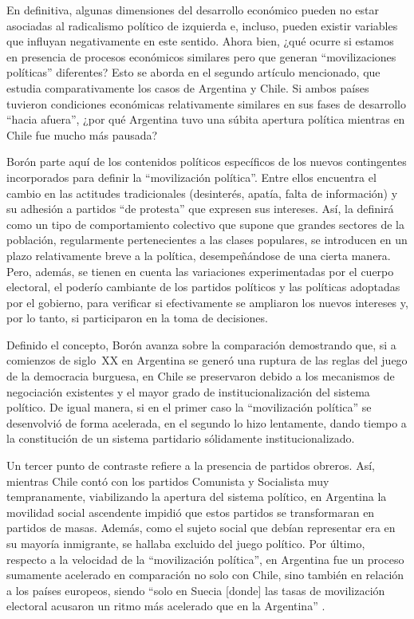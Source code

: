 {En definitiva, algunas dimensiones del desarrollo económico pueden no estar asociadas al radicalismo político de izquierda e, incluso, pueden existir variables que influyan negativamente en este sentido. Ahora bien, ¿qué ocurre si estamos en presencia de procesos económicos similares pero que generan \enquote{movilizaciones políticas} diferentes? Esto se aborda en el segundo artículo mencionado, que estudia comparativamente los casos de Argentina y Chile. Si ambos países tuvieron condiciones económicas relativamente similares en sus fases de desarrollo \enquote{hacia afuera}, ¿por qué Argentina tuvo una súbita apertura política mientras en Chile fue mucho más pausada?

Borón parte aquí de los contenidos políticos específicos de los nuevos contingentes incorporados para definir la \enquote{movilización política}. Entre ellos encuentra el cambio en las actitudes tradicionales (desinterés, apatía, falta de información) y su adhesión a partidos \enquote{de protesta} que expresen sus intereses. Así, la definirá como un tipo de comportamiento colectivo que supone que grandes sectores de la población, regularmente pertenecientes a las clases populares, se introducen en un plazo relativamente breve a la política, desempeñándose de una cierta manera. Pero, además, se tienen en cuenta las variaciones experimentadas por el cuerpo electoral, el poderío cambiante de los partidos políticos y las políticas adoptadas por el gobierno, para verificar si efectivamente se ampliaron los nuevos intereses y, por lo tanto, si participaron en la toma de decisiones.

Definido el concepto, Borón avanza sobre la comparación demostrando que, si a comienzos de siglo~XX en Argentina se generó una ruptura de las reglas del juego de la democracia burguesa, en Chile se preservaron debido a los mecanismos de negociación existentes y el mayor grado de institucionalización del sistema político. De igual manera, si en el primer caso la \enquote{movilización política} se desenvolvió de forma acelerada, en el segundo lo hizo lentamente, dando tiempo a la constitución de un sistema partidario sólidamente institucionalizado.

Un tercer punto de contraste refiere a la presencia de partidos obreros. Así, mientras Chile contó con los partidos Comunista y Socialista muy tempranamente, viabilizando la apertura del sistema político, en Argentina la movilidad social ascendente impidió que estos partidos se transformaran en partidos de masas. Además, como el sujeto social que debían representar era en su mayoría inmigrante, se hallaba excluido del juego político. Por último, respecto a la velocidad de la \enquote{movilización política}, en Argentina fue un proceso sumamente acelerado en comparación no solo con Chile, sino también en relación a los países europeos, siendo \enquote{solo en Suecia [donde] las tasas de movilización electoral acusaron un ritmo más acelerado que en la Argentina} \parencite[232]{1573-BORON1972}.

}
